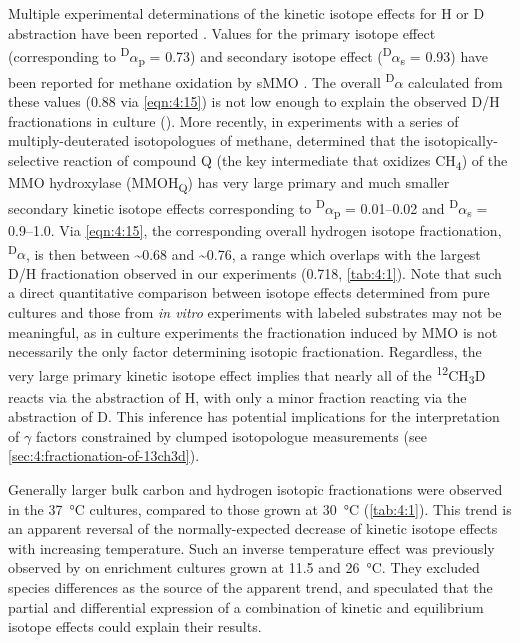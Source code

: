 Multiple experimental determinations of the kinetic isotope effects for
H or D abstraction have been reported \parencite[e.g.,][and references therein]{Green+Dalton_1989_JBC,Rataj++_1991_JBC,Wilkins++_1994_EJB}. Values for the primary isotope effect (corresponding to
\textsuperscript{D}$\alpha$\textsubscript{p} = 0.73) and secondary isotope
effect (\textsuperscript{D}$\alpha$\textsubscript{s} = 0.93) have been reported
for methane oxidation by sMMO \parencite{Wilkins++_1994_EJB}. The overall
\textsuperscript{D}$\alpha$ calculated from these values (0.88 via \autoref{eqn:4:15}) is
not low enough to explain the observed D/H fractionations in culture
(). More recently, in experiments with a series of
multiply-deuterated isotopologues of methane, \textcite{Nesheim+Lipscomb_1996_Bc} determined that the isotopically-selective reaction of compound Q
(the key intermediate that oxidizes CH\textsubscript{4}) of the MMO
hydroxylase (MMOH\textsubscript{Q}) has very large primary and much
smaller secondary kinetic isotope effects corresponding to
\textsuperscript{D}$\alpha$\textsubscript{p} = 0.01--0.02 and
\textsuperscript{D}$\alpha$\textsubscript{s} = 0.9--1.0. Via \autoref{eqn:4:15}, the
corresponding overall hydrogen isotope fractionation,
\textsuperscript{D}$\alpha$, is then between \textasciitilde{}0.68 and
\textasciitilde{}0.76, a range which overlaps with the largest D/H
fractionation observed in our experiments (0.718, \autoref{tab:4:1}). Note that
such a direct quantitative comparison between isotope effects determined
from pure cultures and those from \emph{in vitro} experiments with
labeled substrates may not be meaningful, as in culture experiments the
fractionation induced by MMO is not necessarily the only factor
determining isotopic fractionation. Regardless, the very large primary
kinetic isotope effect implies that nearly all of the
\textsuperscript{12}CH\textsubscript{3}D reacts via the abstraction of
H, with only a minor fraction reacting via the abstraction of D. This
inference has potential implications for the interpretation of $\gamma$ factors
constrained by clumped isotopologue measurements (see \autoref{sec:4:fractionation-of-13ch3d}).

Generally larger bulk carbon and hydrogen isotopic fractionations were
observed in the 37~°C cultures, compared to those grown at 30~°C (\autoref{tab:4:1}). This trend is an apparent reversal of the normally-expected decrease
of kinetic isotope effects with increasing temperature. Such an inverse
temperature effect was previously observed by \textcite{Coleman++_1981_GCA} on
enrichment cultures grown at 11.5 and 26~°C. They excluded species
differences as the source of the apparent trend, and speculated that the
partial and differential expression of a combination of kinetic and
equilibrium isotope effects could explain their results.

